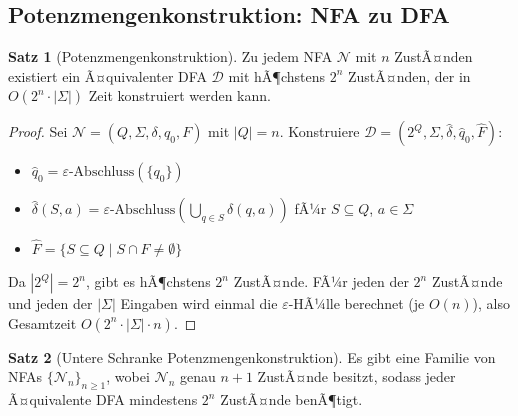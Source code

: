 ﻿\documentclass[a4paper,12pt]{article}
\theoremstyle{definition}
\newtheorem{satz}{Satz}
\begin{document}
\subsection{Potenzmengenkonstruktion: NFA zu DFA}

\begin{satz}[Potenzmengenkonstruktion]
	\label{satz:powerset}
	Zu jedem NFA $\mathcal{N}$ mit $n$ ZustÃ¤nden existiert ein Ã¤quivalenter DFA
	$\mathcal{D}$ mit hÃ¶chstens $2^n$ ZustÃ¤nden, der in $O(2^n \cdot |\Sigma|)$
	Zeit konstruiert werden kann.
\end{satz}

\begin{proof}
	Sei $\mathcal{N} = (Q, \Sigma, \delta, q_0, F)$ mit $|Q| = n$.
	Konstruiere $\mathcal{D} = (2^Q, \Sigma, \hat{\delta}, \hat{q}_0, \hat{F})$:
	\begin{itemize}
		\item $\hat{q}_0 = \varepsilon\text{-}\mathrm{Abschluss}(\{q_0\})$
		\item $\hat{\delta}(S, a) = \varepsilon\text{-}\mathrm{Abschluss}
		      \!\left(\bigcup_{q \in S} \delta(q, a)\right)$ fÃ¼r $S \subseteq Q$,
		      $a \in \Sigma$
		\item $\hat{F} = \{S \subseteq Q \mid S \cap F \neq \emptyset\}$
	\end{itemize}
	Da $|2^Q| = 2^n$, gibt es hÃ¶chstens $2^n$ ZustÃ¤nde. FÃ¼r jeden der $2^n$
	ZustÃ¤nde und jeden der $|\Sigma|$ Eingaben wird einmal die
	$\varepsilon$-HÃ¼lle berechnet (je $O(n)$), also Gesamtzeit
	$O(2^n \cdot |\Sigma| \cdot n)$. \qedhere
\end{proof}

\begin{satz}[Untere Schranke Potenzmengenkonstruktion]
	\label{satz:powerset-lb}
	Es gibt eine Familie von NFAs $\{\mathcal{N}_n\}_{n \geq 1}$, wobei
	$\mathcal{N}_n$ genau $n+1$ ZustÃ¤nde besitzt, sodass jeder Ã¤quivalente DFA
	mindestens $2^n$ ZustÃ¤nde benÃ¶tigt.
\end{satz}
\end{document}

